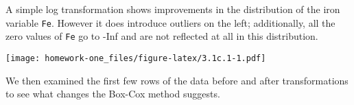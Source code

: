 \documentclass[openany]{book}
\newenvironment{Shaded}{\begin{snugshade}}{\end{snugshade}}
\newcommand{\DataTypeTok}[1]{\textcolor[rgb]{0.13,0.29,0.53}{#1}}
\newcommand{\DecValTok}[1]{\textcolor[rgb]{0.00,0.00,0.81}{#1}}
\newcommand{\KeywordTok}[1]{\textcolor[rgb]{0.13,0.29,0.53}{\textbf{#1}}}
\newcommand{\NormalTok}[1]{#1}
\newcommand{\OperatorTok}[1]{\textcolor[rgb]{0.81,0.36,0.00}{\textbf{#1}}}
\newcommand{\StringTok}[1]{\textcolor[rgb]{0.31,0.60,0.02}{#1}}
\begin{document}
A simple log transformation shows improvements in the distribution of the iron variable \texttt{Fe}. However it does introduce outliers on the left; additionally, all the zero values of \texttt{Fe} go to -Inf and are not reflected at all in this distribution.

\begin{Shaded}
\end{Shaded}

\texttt{[image: homework-one\_files/figure-latex/3.1c.1-1.pdf]}

We then examined the first few rows of the data before and after transformations to see what changes the Box-Cox method suggests.

\begin{Shaded}
\end{Shaded}
\end{document}
